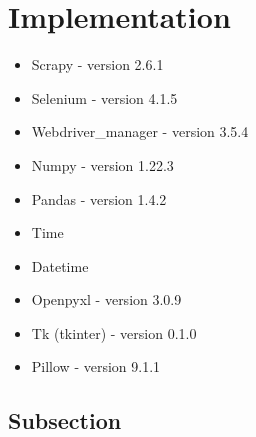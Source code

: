 \documentclass[main]{subfiles}
\begin{document}
\section{Implementation}
\begin{itemize}
    \item Scrapy -  version 2.6.1
    \item Selenium - version 4.1.5
    \item Webdriver\_manager - version 3.5.4
    \item Numpy -  version 1.22.3
    \item Pandas  - version 1.4.2
    \item Time
    \item Datetime
    \item Openpyxl - version 3.0.9
    \item Tk (tkinter) - version 0.1.0
    \item Pillow - version 9.1.1
\end{itemize}

\subsection{Subsection}
\end{document}
